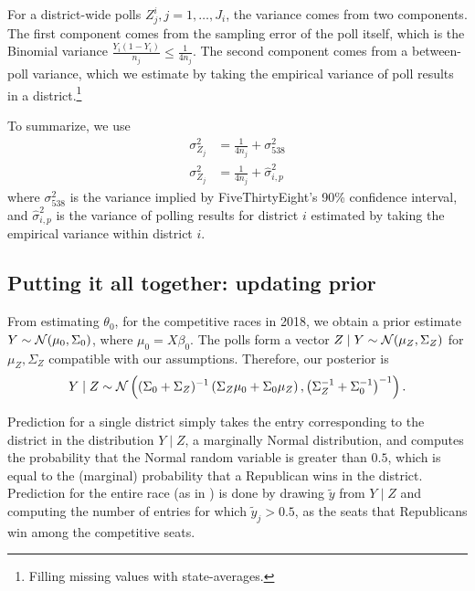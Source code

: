 \documentclass[11pt]{article}
\begin{document}
For a district-wide polls $Z_j^i, j = 1,\ldots,J_i$, the variance comes from two components. The first component comes from the sampling error of the poll itself, which is the Binomial variance $\frac{Y_i(1-Y_i)}{n_j} \le \frac{1}{4n_j}$. The second component comes from a between-poll variance, which we estimate by taking the empirical variance of poll results in a district.\footnote{Filling missing values with state-averages.} 

To summarize, we use \begin{align*}
\sigma^2_{Z_j} &= \frac{1}{4n_j} + \sigma^2_{538} \tag{Estimation for generic ballot poll variance}\\
\sigma^2_{Z_j} &= \frac{1}{4n_j} + \hat\sigma^2_{i,p} \tag{Estimation for district poll variance}
\end{align*}
where $ \sigma^2_{538}$ is the variance implied by FiveThirtyEight's 90\% confidence interval, and $\hat \sigma_{i,p}^2$ is the variance of polling results for district $i$ estimated by taking the empirical variance within district $i$.

\subsection{Putting it all together: updating prior}
From estimating $\theta_0$, for the competitive races in 2018, we obtain a prior estimate $Y \sim \mathcal{N}(\mu_0, \Sigma_0)$, where $\mu_0 = X\beta_0$. The polls form a vector $Z \mid Y \sim \mathcal{N}(\mu_Z, \Sigma_Z)$ for $\mu_Z, \Sigma_Z$ compatible with our assumptions. Therefore, our posterior is \[
Y\mid Z \sim \mathcal{N}\left({(\Sigma_0 + \Sigma_Z)^{-1} \left({\Sigma_Z\mu_0 + \Sigma_0 \mu_Z}\right), \left({\Sigma_Z^{-1} + \Sigma_0^{-1}}\right)^{-1}}\right).
\]

Prediction for a single district simply takes the entry corresponding to the
district in the distribution $Y \mid Z$, a marginally Normal distribution, and
computes the probability that the Normal random variable is greater than $0.5$,
which is equal to the (marginal) probability that a Republican wins in the
district. Prediction for the entire race (as in 
) is done by drawing
$\tilde y$ from $Y \mid Z$ and computing the number of entries for which
$\tilde y_j > 0.5$, as the seats that Republicans win among the competitive
seats.

\end{document}
